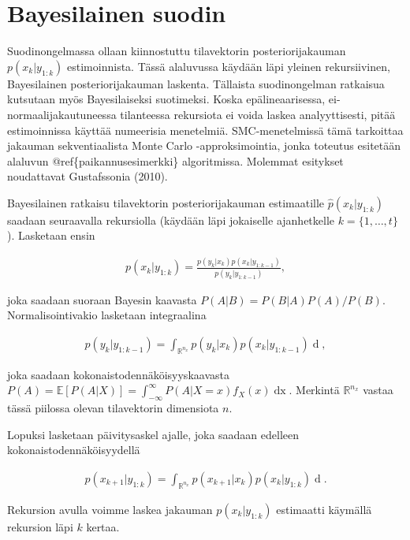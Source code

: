\documentclass[
  12pt,
  a4paper, twoside]{book}
\begin{document}
\section{Bayesilainen suodin} \label{bayesilainen-suodin}

Suodinongelmassa ollaan kiinnostuttu tilavektorin posteriorijakauman \(p(x_k|y_{1:k})\) estimoinnista. Tässä alaluvussa käydään läpi yleinen rekursiivinen, Bayesilainen posteriorijakauman laskenta. Tällaista suodinongelman ratkaisua kutsutaan myös Bayesilaiseksi suotimeksi. Koska epälineaarisessa, ei-normaalijakautuneessa tilanteessa rekursiota ei voida laskea analyyttisesti, pitää estimoinnissa käyttää numeerisia menetelmiä. SMC-menetelmissä tämä tarkoittaa jakauman sekventiaalista Monte Carlo -approksimointia, jonka toteutus esitetään alaluvun @ref\{paikannusesimerkki\} algoritmissa. Molemmat esitykset noudattavat Gustafssonia (2010).

Bayesilainen ratkaisu tilavektorin posteriorijakauman estimaatille \(\hat{p}(x_k|y_{1:k})\) saadaan seuraavalla rekursiolla (käydään läpi jokaiselle ajanhetkelle \(k=\{1,\ldots,t\}\)). Lasketaan ensin

\begin{align}\label{bayes-paivitys}
p(x_k|y_{1:k}) = \frac{p(y_k|x_k)p(x_k|y_{1:k-1})}{p(y_k|y_{1:k-1})},
\end{align}

\noindent joka saadaan suoraan Bayesin kaavasta \(P(A|B)=P(B|A)P(A)/P(B)\). Normalisointivakio lasketaan integraalina

\begin{align}\label{bayes-normalisointi}
p(y_k|y_{1:k-1})=\int_{\mathbb{R}^{n_x}}p(y_k|x_k)p(x_k|y_{1:k-1})\mathop{dx_k},
\end{align}

\noindent joka saadaan kokonaistodennäköisyyskaavasta \(P(A)=\mathbb{E}[P(A|X)]=\int_{-\infty}^{\infty}P(A|X=x)f_X(x)\mathop{dx}\). Merkintä \(\mathbb{R}^{n_x}\) vastaa tässä piilossa olevan tilavektorin dimensiota \(n\).

Lopuksi lasketaan päivitysaskel ajalle, joka saadaan edelleen kokonaistodennäköisyydellä

\begin{align}\label{bayes-aikapaivitys}
p(x_{k+1}|y_{1:k})=\int_{\mathbb{R}^{n_x}}p(x_{k+1}|x_k)p(x_k|y_{1:k})\mathop{dx_k}.
\end{align}

\noindent Rekursion avulla voimme laskea jakauman \(p(x_k|y_{1:k})\) estimaatti käymällä rekursion läpi \(k\) kertaa.
\end{document}
